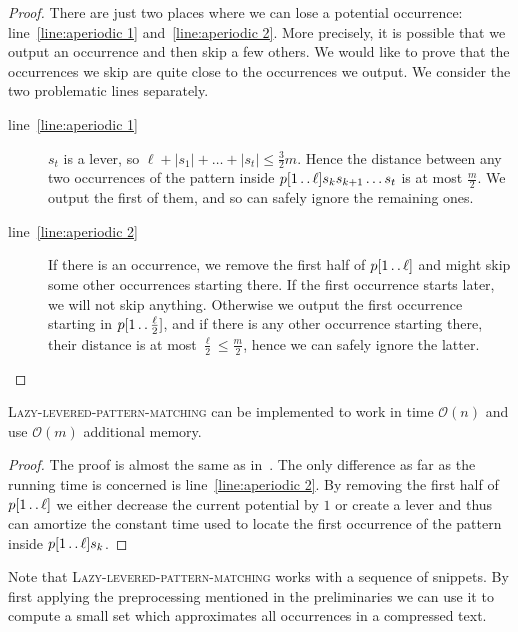 \documentclass[runningheads]{llncs}
\newcommand{\twodots}{\mathinner{\ldotp\ldotp}}
\newcommand{\proc}[1]{\textnormal{\scshape#1}}
\begin{document}
\begin{proof}
There are just two places where we can lose a potential occurrence: line~\ref{line:aperiodic 1} and~\ref{line:aperiodic 2}. More precisely,
it is possible that we output an occurrence and then skip a few others. We would like to prove that the occurrences we skip are quite close
to the occurrences we output. We consider the two problematic lines separately.
\begin{description}
\item[line~\ref{line:aperiodic 1}] $s_{t}$ is a lever, so $\ell+|s_{1}|+\ldots+|s_{t}|\leq\frac{3}{2}m$. Hence the distance between any two occurrences
of the pattern inside $p[1\twodots \ell] s_k s_{k+1} \ldots s_t$ is at most $\frac{m}{2}$. We output the first of them, and so can safely ignore the
remaining ones.
\item[line~\ref{line:aperiodic 2}] If there is an occurrence, we remove the first half of $p[1\twodots\ell]$ and might skip some other occurrences starting
there. If the first occurrence starts later, we will not skip anything. Otherwise we output the first occurrence starting in $p[1\twodots\frac{\ell}{2}]$,
and if there is any other occurrence starting there, their distance is at most $\frac{\ell}{2}\leq\frac{m}{2}$, hence we can safely ignore the latter.
\end{description}
\end{proof}



\begin{lemma}
\label{lemma:aperiodic time}
\proc{Lazy-levered-pattern-matching} can be implemented to work in time $\mathcal{O}(n)$ and use $\mathcal{O}(m)$ additional memory.
\end{lemma}

\begin{proof}
The proof is almost the same as in~\cite{GawrychowskiLZW}. The only difference as far as the running time is concerned is
line~\ref{line:aperiodic 2}. By removing the first half of $p[1\twodots\ell]$ we either decrease the current potential by $1$ or create a lever and thus can amortize the constant time used to locate the first occurrence of the pattern inside $p[1\twodots\ell] s_{k}$.
\end{proof}

Note that \proc{Lazy-levered-pattern-matching} works with a sequence of snippets. By first applying the preprocessing mentioned in
the preliminaries we can use it to compute a small set which approximates all occurrences in a compressed text.
\end{document}
